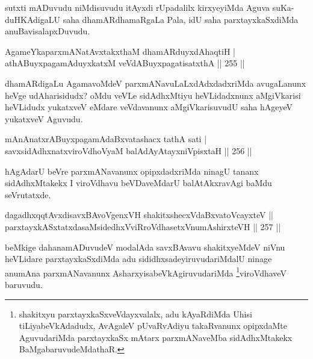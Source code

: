 \begin{artha}
sutxti mADuvudu niMdisuvudu itAyxdi rUpadalilx kirxyeyiMda Aguva suKa-duHKAdigaLU saha dhamARdhamaRgaLa Pala, idU saha parxtayxkaSxdiMda anuBavisalapxDuvudu.
\end{artha}

\begin{shl}
AgameYkaparxmANatAvxtakxthaM dhamARduyxdAhaqtiH | \\
athABuyxpagamAduyxkatxM veVdABuyxpagatisatxthA \hfill ||  255 ||  
\end{shl}

\begin{artha}
dhamARdigaLu AgamavoMdeV parxmANavuLaLxdAdxdadxriMda avugaLanunx heVge udAharisidudx? oMdu veVLe sidAdhxMtiyu heVLidadxnunx aMgiVkarisi heVLidudx yukatxveV eMdare veVdavanunx aMgiVkarisuvudU saha hAgeyeV yukatxveV Aguvudu.
\end{artha}


\begin{shl}
mAnAnatxrABuyxpagamAdaBxvatashacx tathA sati | \\
savxsidAdhxnatxviroVdhoV\s yaM balAdAyAtayxniVpisxtaH \hfill ||  256 ||  
\end{shl}

\begin{artha}
hAgAdarU beVre parxmANavanunx opipxdadxriMda ninagU tananx sidAdhxMtakekx I viroVdhavu beVDaveMdarU balAtAkxravAgi baMdu seVrutatxde. 
\end{artha}

\begin{shl}
dagadhxqqtAvxdisavxBAvoV\s genxVH shakitxshecxVdaBxvatoVcayxteV ||  \\
parxtayxkASxtatxdasaMsidedhxVviRroVdhasetxV\s numAshirxteVH \hfill ||  257 ||  
\end{shl}

\begin{artha}
beMkige dahanamADuvudeV modalAda savxBAvavu shakitxyeMdeV niVnu heVLidare parxtayxkaSxdiMda adu sididhxsadeyiruvudariMdalU ninage anumAna parxmANavanunx AsharxyisabeVkAgiruvudariMda \footnote{shakitxyu parxtayxkaSxveVdayxvalalx, adu kAyaRdiMda Uhisi tiLiyabeVkAdadudx, AvAgaleV pUvaRvAdiyu takaRvanunx opipxdaMte AguvudariMda parxtayxkaSx mAtarx parxmANaveMba sidAdhxMtakekx BaMgabaruvudeMdathaR.}viroVdhaveV baruvudu.
\end{artha}


